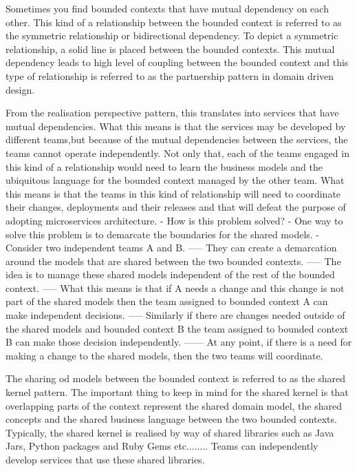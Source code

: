 Sometimes you find bounded contexts that have mutual dependency on each other.
This kind of a relationship between the bounded context is referred to as the symmetric relationship or bidirectional dependency.
To depict a symmetric relationship, a solid line is placed between the bounded contexts.
This mutual dependency leads to high level of coupling between the bounded context and this type of relationship is referred to as the partnership pattern in domain driven design.

From the realisation perspective pattern, this translates into services that have mutual dependencies.
What this means is that the services may be developed by different teams,but because of the mutual dependencies between the services, the teams cannot operate independently.
Not only that, each of the teams engaged in this kind of a relationship would need to learn the business models and the ubiquitous language for the bounded context managed by the other team.
What this means is that the teams in this kind of relationship will need to coordinate their changes, deployments and their releases and that will defeat the purpose of adopting microservices architecture.
- How is this problem solved?
- One way to solve this problem is to demarcate the boundaries for the shared models.
- Consider two independent teams A and B.
----- They can create a demarcation around the models that are shared between the two bounded contexts.
----- The idea is to manage these shared models independent of the rest of the bounded context.
----- What this means is that if A needs a change and this change is not part of the shared models then the team assigned to bounded context A can make independent decisions.
----- Similarly if there are changes needed outside of the shared models and bounded context B the team assigned to bounded context B can make those decision independently.
------ At any point, if there is a need for making a change to the shared models, then the two teams will coordinate.

The sharing od models between the bounded context is referred to as the shared kernel pattern.
The important thing to keep in mind for the shared kernel is that overlapping parts of the context represent the shared domain model, the shared concepts and the shared business language between the two bounded contexts.
Typically, the shared kernel is realised by way of shared libraries such as Java Jars, Python packages and Ruby Gems etc........
Teams can independently develop services that use these shared libraries.

